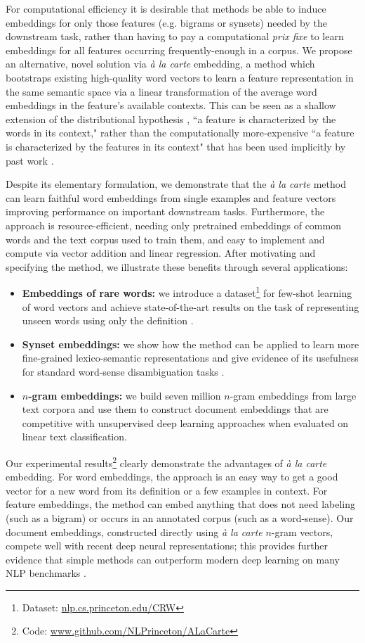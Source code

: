 \documentclass[11pt,a4paper]{article}
\begin{document}
For computational efficiency it is desirable that methods be able to induce embeddings for only those features (e.g. bigrams or synsets) needed by the downstream task, rather than having to pay a computational {\em prix fixe} to learn embeddings for all features occurring frequently-enough in a corpus. 
We propose an alternative, novel solution via {\em\`a la carte} embedding, a method which bootstraps existing high-quality word vectors to learn a feature representation in the same semantic space via a linear transformation of the average word embeddings in the feature's available contexts.
This can be seen as a shallow extension of the distributional hypothesis \cite{Harris:54}, ``a feature is characterized by the words in its context," rather than the computationally more-expensive ``a feature is characterized by the features in its context" that has been used implicitly by past work \cite{Rothe:15,Logeswaran:18}. 

Despite its elementary formulation, we demonstrate that the {\em\`a la carte} method can learn faithful word embeddings from single examples and feature vectors improving performance on important downstream tasks.
Furthermore, the approach is resource-efficient, needing only pretrained embeddings of common words and the text corpus used to train them, and easy to implement and compute via vector addition and linear regression.
After motivating and specifying the method, we illustrate these benefits through several applications:
\begin{itemize}
	\item {\bf Embeddings of rare words:} we introduce a dataset\footnote{Dataset: \url{nlp.cs.princeton.edu/CRW}} for few-shot learning of word vectors and achieve state-of-the-art results on the task of representing unseen words using only the definition \cite{Herbelot:17}.
	\item {\bf Synset embeddings:} we show how the method can be applied to learn more fine-grained lexico-semantic representations and give evidence of its usefulness for standard word-sense disambiguation tasks \cite{Navigli:13,Moro:15}.
	\item {\bf $n$-gram embeddings:} we build seven million $n$-gram embeddings from large text corpora and use them to construct document embeddings that are competitive with unsupervised deep learning approaches when evaluated on linear text classification.
\end{itemize}
Our experimental results\footnote{Code: \url{www.github.com/NLPrinceton/ALaCarte}} clearly demonstrate the advantages of {\em\` a la carte} embedding.
For word embeddings, the approach is an easy way to get a good vector for a new word from its definition or a few examples in context.
For feature embeddings, the method can embed anything that does not need labeling (such as a bigram) or occurs in an annotated corpus (such as a word-sense).
Our document embeddings, constructed directly using {\em\` a la carte} $n$-gram vectors, compete well with recent deep neural representations; this provides further evidence that simple methods can outperform modern deep learning on many NLP benchmarks \cite{Arora:17,Mu:18,Arora:18a,Arora:18b,Pagliardini:18}. 
\end{document}
